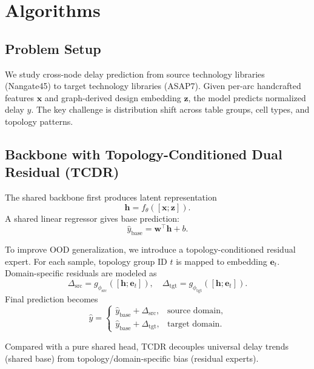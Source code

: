 \section{Algorithms}
\label{sec:algorithm}

\subsection{Problem Setup}
We study cross-node delay prediction from source technology libraries (Nangate45) to target technology libraries (ASAP7).
Given per-arc handcrafted features $\mathbf{x}$ and graph-derived design embedding $\mathbf{z}$, the model predicts normalized delay $y$.
The key challenge is distribution shift across table groups, cell types, and topology patterns.

\subsection{Backbone with Topology-Conditioned Dual Residual (TCDR)}
The shared backbone first produces latent representation
\begin{equation}
\mathbf{h} = f_{\theta}([\mathbf{x};\mathbf{z}]).
\end{equation}
A shared linear regressor gives base prediction:
\begin{equation}
\hat{y}_{\text{base}} = \mathbf{w}^{\top}\mathbf{h} + b.
\end{equation}

To improve OOD generalization, we introduce a topology-conditioned residual expert.
For each sample, topology group ID $t$ is mapped to embedding $\mathbf{e}_t$.
Domain-specific residuals are modeled as
\begin{equation}
\Delta_{\text{src}} = g_{\phi_{\text{src}}}([\mathbf{h};\mathbf{e}_t]),\quad
\Delta_{\text{tgt}} = g_{\phi_{\text{tgt}}}([\mathbf{h};\mathbf{e}_t]).
\end{equation}
Final prediction becomes
\begin{equation}
\hat{y}=
\begin{cases}
\hat{y}_{\text{base}} + \Delta_{\text{src}}, & \text{source domain},\\
\hat{y}_{\text{base}} + \Delta_{\text{tgt}}, & \text{target domain}.
\end{cases}
\end{equation}

Compared with a pure shared head, TCDR decouples universal delay trends (shared base) from topology/domain-specific bias (residual experts).

